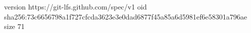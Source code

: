version https://git-lfs.github.com/spec/v1
oid sha256:73c6656798a1f727cfcda3623e3e0dad6877f45a85a6d5981ef6e58301a796ae
size 71
